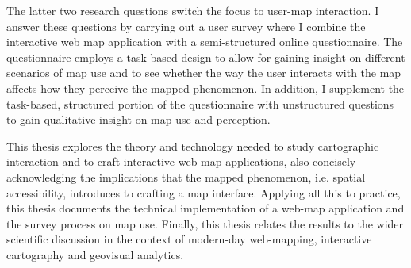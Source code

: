 The latter two research questions switch the focus to user-map interaction.
I answer these questions by carrying out a user survey
where I combine the interactive web map application with
a semi-structured online questionnaire.
The questionnaire employs a task-based design
to allow for gaining insight on different scenarios of map use
and to see whether the way the user interacts with the map
affects how they perceive the mapped phenomenon.
In addition, I supplement the task-based, structured portion of the questionnaire
with unstructured questions to gain qualitative insight on map use and perception.

This thesis explores the theory and technology
needed to study cartographic interaction and to craft interactive web map applications,
also concisely acknowledging the implications that the mapped phenomenon,
i.e. spatial accessibility, introduces to crafting a map interface.
Applying all this to practice, this thesis documents the technical implementation
of a web-map application and the survey process on map use.
Finally, this thesis relates the results to the wider scientific discussion
in the context of modern-day web-mapping, interactive cartography and geovisual analytics. 




